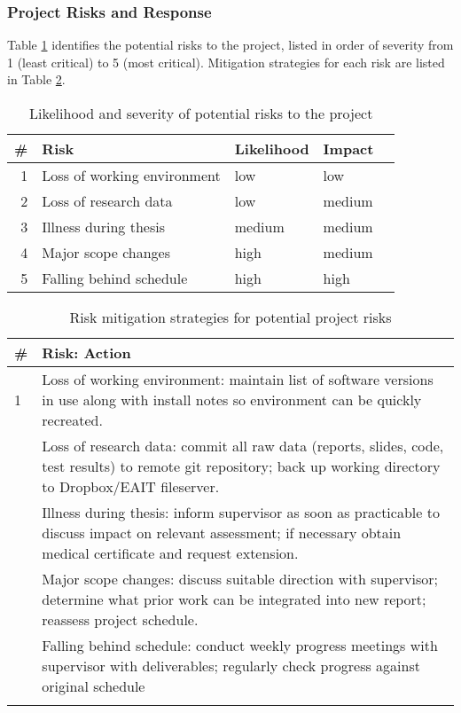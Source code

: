 \documentclass[pdftex,12pt,a4paper]{article}
\begin{document}
\subsubsection{Project Risks and Response}
Table \ref{table:risks} identifies the potential risks to the project, listed in order of severity from 1 (least critical) to 5 (most critical). Mitigation strategies for each risk are listed in Table \ref{table:mitigation}.

\hspace{0.5cm}
\begin{table}[H]
	\begin{center}
		\begin{tabular}{@{}rlllr@{}}
			\toprule
			\# & Risk & Likelihood & Impact \\
			\midrule
			1 & Loss of working environment & low & low \\
			2 & Loss of research data & low & medium \\
			3 & Illness during thesis & medium & medium \\
			4 & Major scope changes & high & medium \\
			5 & Falling behind schedule & high & high \\
			\bottomrule
		\end{tabular}
		\caption{Likelihood and severity of potential risks to the project}
		\label{table:risks}
	\end{center}
\end{table}

\begin{table}[H]
	\begin{center}
		\begin{tabularx}{\textwidth}{p{}X}
			\toprule
			\# & Risk: Action \\
			\midrule
			1 & Loss of working environment:
			maintain list of software versions in use along with install notes so environment can be quickly recreated. \\
			\addlinespace
			2 & Loss of research data:
			commit all raw data (reports, slides, code, test results) to remote git repository; back up working directory to Dropbox/EAIT fileserver. \\
			\addlinespace
			3 & Illness during thesis:
			inform supervisor as soon as practicable to discuss impact on relevant assessment; if necessary obtain medical certificate and request extension. \\
			\addlinespace
			4 & Major scope changes:
			discuss suitable direction with supervisor; determine what prior work can be integrated into new report; reassess project schedule. \\
			\addlinespace
			5 & Falling behind schedule:
			conduct weekly progress meetings with supervisor with deliverables; regularly check progress against original schedule \\
			\addlinespace
			\bottomrule
		\end{tabularx}
		\caption{Risk mitigation strategies for potential project risks}
		\label{table:mitigation}
	\end{center}
\end{table}

\newpage 

\end{document}
